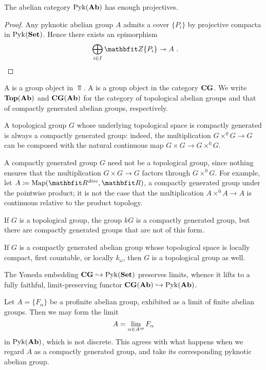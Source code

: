 \begin{prp}
	The abelian category $ \operatorname{Pyk}(\textbf{\textup{Ab}}) $ has enough projectives.
\end{prp}

\begin{proof}
	Any pyknotic abelian group $ A $ admits a cover $ \{ P_i \} $ by projective compacta in $ \operatorname{Pyk}(\textbf{\textup{Set}}) $.
	Hence there exists an epimorphism
	\[
		\bigoplus_{i \in I} \ZZ \{ P_i \} \surjection A \period \qedhere
	\]
\end{proof}

\begin{dfn}
	A  is a group object in $ \Top $.
	A  is a group object in the category $ \textbf{\textup{CG}} $.
	We write $ \textbf{\textup{Top}}(\textbf{\textup{Ab}}) $ and $ \textbf{\textup{CG}}(\textbf{\textup{Ab}}) $ for the category of topological abelian groups and that of compactly generated abelian groups, respectively.
\end{dfn}

\begin{wrn}
	A topological group $ G $ whose underlying topological space is compactly generated is always a compactly generated group:
	indeed, the multiplication $ G \times^0 G \to G $ can be composed with the natural continuous map $ G \times G \to G \times^0 G $.

	A compactly generated group $ G $ need not be a topological group, since nothing ensures that the multiplication $ G \times G \to G $ factors through $ G \times^0 G $.
	For example, let $ A \coloneq \Map(\RR^{\disc}, \RR) $, a compactly generated group under the pointwise product;
	it is not the case that the multiplication $A \times^0 A \to A $ is continuous relative to the product topology.
	
	If $ G $ is a topological group, the group $ kG $ is  a compactly generated group, but there are compactly generated groups that are not of this form.
	
	If $ G $ is a compactly generated abelian group whose topological space is locally compact, first countable, or locally $ k_{\omega} $, then $ G $ is a topological group as well.
\end{wrn}

\begin{cnstr}
	The Yoneda embedding $ \textbf{\textup{CG}} \hookrightarrow \operatorname{Pyk}(\textbf{\textup{Set}}) $ preserves limits, whence it lifts to a fully faithful, limit-preserving functor $ \textbf{\textup{CG}}(\textbf{\textup{Ab}}) \hookrightarrow \operatorname{Pyk}(\textbf{\textup{Ab}}) $.
\end{cnstr}

\begin{exm}
	Let $ A = \{ F_{\alpha} \} $ be a profinite abelian group, exhibited as a limit of finite abelian groups.
	Then we may form the limit
	\[
		A = \lim_{\alpha \in A^{\textit{op}}} F_{\alpha}
	\]
	in $ \operatorname{Pyk}(\textbf{\textup{Ab}}) $, which is not discrete.
	This agrees with what happens when we regard $ A $ as a compactly generated group, and take its corresponding pyknotic abelian group.
\end{exm}

